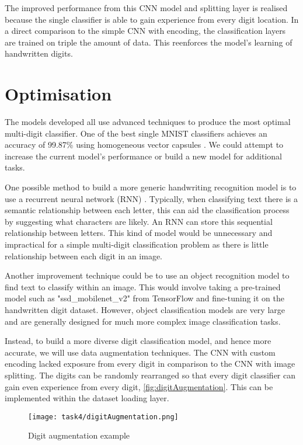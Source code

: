 The improved performance from this CNN model and splitting layer is realised because the single classifier is able to gain experience from every digit location. In a direct comparison to the simple CNN with encoding, the classification layers are trained on triple the amount of data. This reenforces the model’s learning of handwritten digits.

\pagebreak
\section{Optimisation}

The models developed all use advanced techniques to produce the most optimal multi-digit classifier. One of the best single MNIST classifiers achieves an accuracy of 99.87\% using homogeneous vector capsules \autocite{byerlyNoRoutingNeeded2021}. We could attempt to increase the current model's performance or build a new model for additional tasks.

One possible method to build a more generic handwriting recognition model is to use a recurrent neural network (RNN) \autocite{advaithHandwritingRecognitionUsing2021}. Typically, when classifying text there is a semantic relationship between each letter, this can aid the classification process by suggesting what characters are likely. An RNN can store this sequential relationship between letters. This kind of model would be unnecessary and impractical for a simple multi-digit classification problem as there is little relationship between each digit in an image. 

Another improvement technique could be to use an object recognition model to find text to classify within an image. This would involve taking a pre-trained model such as "ssd\_mobilenet\_v2" from TensorFlow and fine-tuning it on the handwritten digit dataset. However, object classification models are very large and are generally designed for much more complex image classification tasks.

Instead, to build a more diverse digit classification model, and hence more accurate, we will use data augmentation techniques. The CNN with custom encoding lacked exposure from every digit in comparison to the CNN with image splitting. The digits can be randomly rearranged so that every digit classifier can gain even experience from every digit, \autoref{fig:digitAugmentation}. This can be implemented within the dataset loading layer.

\begin{figure}[!htbp]
    \centering
    \texttt{[image: task4/digitAugmentation.png]}
    \caption[Digit augmentation example]
    {Digit augmentation example}
    \label{fig:digitAugmentation}
\end{figure}

